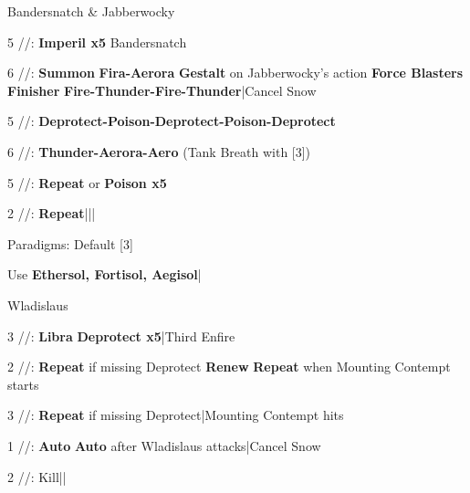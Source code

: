 \begin{fight}{Bandersnatch \& Jabberwocky}
	\item [5] \sab/\rav/\rav: \textbf{Imperil x5} Bandersnatch
	\item [6] \rav/\rav/\rav: \textbf{Summon} \to \textbf{Fira-Aerora} \to \textbf{Gestalt} on Jabberwocky's action \to \textbf{Force Blasters} \to \textbf{Finisher} \to \textbf{Fire-Thunder-Fire-Thunder}|Cancel Snow
	\item [5] \sab/\rav/\rav: \textbf{Deprotect-Poison-Deprotect-Poison-Deprotect}
	\item [6] \rav/\rav/\rav: \textbf{Thunder-Aerora-Aero} (Tank Breath with [3])
	\item [5] \sab/\rav/\rav: \textbf{Repeat} or \textbf{Poison x5}
	\item [2] \sab/\com/\com: \textbf{Repeat}|\skip|\skip|\skip
\end{fight}
\begin{menu}
	\item Paradigms: Default [3]
\end{menu}
\begin{mainlist}
	\item Use \textbf{Ethersol, Fortisol, Aegisol}|\skip
\end{mainlist}
\begin{fight}{Wladislaus}
	\item [3] \sab/\sen/\syn: \textbf{Libra} \to \textbf{Deprotect x5}|Third Enfire
	\item [2] \sab/\com/\com: \textbf{Repeat} if missing Deprotect \to \textbf{Renew} \to \textbf{Repeat} when Mounting Contempt starts
	\item [3] \sab/\sen/\syn: \textbf{Repeat} if missing Deprotect|Mounting Contempt hits
	\item [1] \med/\com/\com: \textbf{Auto} \to \textbf{Auto} after Wladislaus attacks|Cancel Snow
	\item [2] \sab/\com/\com: Kill|\skip|\skip
\end{fight}
